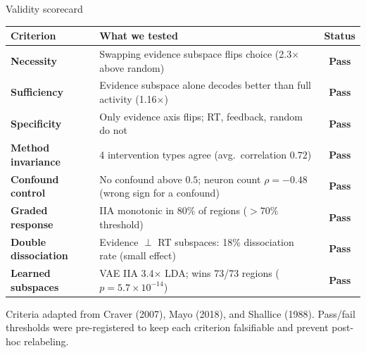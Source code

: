 \documentclass[aspectratio=169,11pt]{beamer}
\begin{document}
\begin{frame}{Validity scorecard}
\vspace{0.5em}
\begin{center}
{\scriptsize
\begin{tabular}{lp{7cm}c}
\toprule
\textbf{Criterion} & \textbf{What we tested} & \textbf{Status} \\
\midrule
\textbf{Necessity} & Swapping evidence subspace flips choice (2.3$\times$ above random) & \textcolor{pass}{\textbf{Pass}} \\
\textbf{Sufficiency} & Evidence subspace alone decodes better than full activity (1.16$\times$) & \textcolor{pass}{\textbf{Pass}} \\
\textbf{Specificity} & Only evidence axis flips; RT, feedback, random do not & \textcolor{pass}{\textbf{Pass}} \\
\textbf{Method invariance} & 4 intervention types agree (avg.\ correlation $0.72$) & \textcolor{pass}{\textbf{Pass}} \\
\textbf{Confound control} & No confound above $0.5$; neuron count $\rho = -0.48$ (wrong sign for a confound) & \textcolor{pass}{\textbf{Pass}} \\
\textbf{Graded response} & IIA monotonic in 80\% of regions ($> 70\%$ threshold) & \textcolor{pass}{\textbf{Pass}} \\
\textbf{Double dissociation} & Evidence $\perp$ RT subspaces: 18\% dissociation rate (small effect) & \textcolor{pass}{\textbf{Pass}} \\
\textbf{Learned subspaces} & VAE IIA 3.4$\times$ LDA; wins 73/73 regions ($p = 5.7 \times 10^{-14}$) & \textcolor{pass}{\textbf{Pass}} \\
\bottomrule
\end{tabular}
}
\end{center}

\vspace{0.6em}
{\small Criteria adapted from Craver (2007), Mayo (2018), and Shallice (1988). Pass/fail thresholds were pre-registered to keep each criterion falsifiable and prevent post-hoc relabeling.}
\end{frame}

\end{document}
